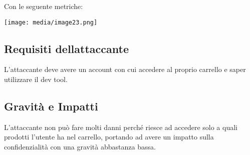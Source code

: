 Con le seguente metriche:

\texttt{[image: media/image23.png]}

\subsection{Requisiti
dell\textquotesingle attaccante}\label{requisiti-dellattaccante-2}

L'attaccante deve avere un account con cui accedere al proprio carrello
e saper utilizzare il dev tool.

\subsection{Gravità e Impatti}\label{gravituxe0-e-impatti-2}

L'attaccante non può fare molti danni perché riesce ad accedere solo a
quali prodotti l'utente ha nel carrello, portando ad avere un impatto
sulla confidenzialità con una gravità abbastanza bassa.
